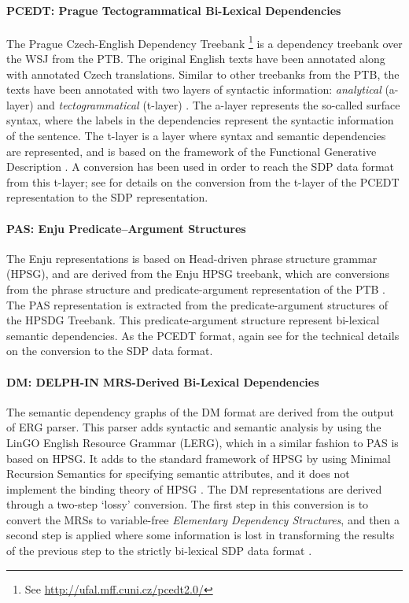 \paragraph{PCEDT: Prague Tectogrammatical Bi-Lexical Dependencies} The Prague Czech-English Dependency Treebank \cite{PCEDT}\footnote{See \url{http://ufal.mff.cuni.cz/pcedt2.0/}} is a dependency treebank over the WSJ from the PTB. The original English texts have been annotated along with annotated Czech translations. Similar to other treebanks from the PTB, the texts have been annotated with two layers of syntactic information: \textit{analytical} (a-layer) and \textit{tectogrammatical} (t-layer) \cite{Oepen:14}. The a-layer represents the so-called surface syntax, where the labels in the dependencies represent the syntactic information of the sentence. The t-layer is a layer where syntax and semantic dependencies are represented, and is based on the framework of the Functional Generative Description \cite{Sgall:86}. A conversion has been used in order to reach the SDP data format from this t-layer; see  for details on the conversion from the t-layer of the PCEDT representation to the SDP representation.

\paragraph{PAS: Enju Predicate–Argument Structures} The Enju representations is based on Head-driven phrase structure grammar (HPSG), and are derived from the Enju HPSG treebank, which are conversions from the phrase structure and predicate-argument representation of the PTB \cite{Oepen:14}. The PAS representation is extracted from the predicate-argument structures of the HPSDG Treebank. This predicate-argument structure represent bi-lexical semantic dependencies. As the PCEDT format, again see  for the technical details on the conversion to the SDP data format.

\paragraph{DM: DELPH-IN MRS-Derived Bi-Lexical Dependencies} The semantic dependency graphs of the DM format are derived from the output of ERG parser. This parser adds syntactic and semantic analysis by using the LinGO English Resource Grammar (LERG), which in a similar fashion to PAS is based on HPSG. It adds to the standard framework of HPSG by using Minimal Recursion Semantics for specifying semantic attributes, and it does not implement the binding theory of HPSG \cite{Flickinger:00}. The DM representations are derived through a two-step `lossy' conversion. The first step in this conversion is to convert the MRSs to variable-free \textit{Elementary Dependency Structures}, and then a second step is applied where some information is lost in transforming the results of the previous step to the strictly bi-lexical SDP data format \cite{Miyao:14}.

